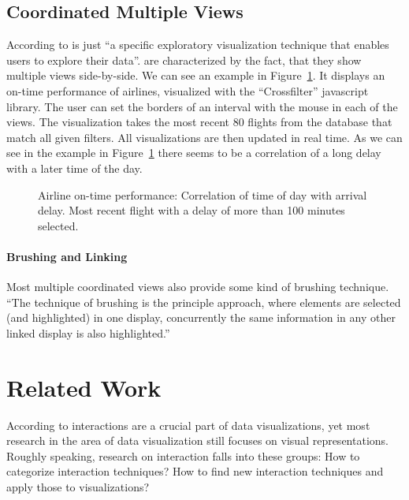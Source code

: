 \subsection{Coordinated Multiple Views}
According to \textcite{Roberts2007} \cmvs{} is just ``a specific exploratory visualization technique that enables users to explore their data''.
\cmvs{} are characterized by the fact, that they show multiple views side-by-side.
We can see an example in Figure~\ref{fig:research:cmv}.
It displays an on-time performance of airlines, visualized with the ``Crossfilter'' javascript library.
The user can set the borders of an interval with the mouse in each of the views.
The visualization takes the most recent 80 flights from the database that match all given filters.
All visualizations are then updated in real time.
As we can see in the example in Figure~\ref{fig:research:cmv} there seems to be a correlation of a long delay with a later time of the day.

\begin{figure}[h]
  \centering
  \caption{Airline on-time performance: Correlation of time of day with arrival delay. Most recent flight with a delay of more than 100 minutes selected.}\label{fig:research:cmv}
\end{figure}

\paragraph{Brushing and Linking}
Most multiple coordinated views also provide some kind of brushing technique.
``The technique of brushing is the principle approach, where elements are selected (and highlighted) in one display, concurrently the same information in any other linked display is also highlighted.''\cite{Roberts2007}

\clearpage
\section{Related Work}\label{sec:related-work}
According to \textcite{Ho2013} interactions are a crucial part of data visualizations, yet most research in the area of data visualization still focuses on visual representations.
Roughly speaking, research on interaction falls into these groups:
How to categorize interaction techniques?
How to find new interaction techniques and apply those to visualizations?

